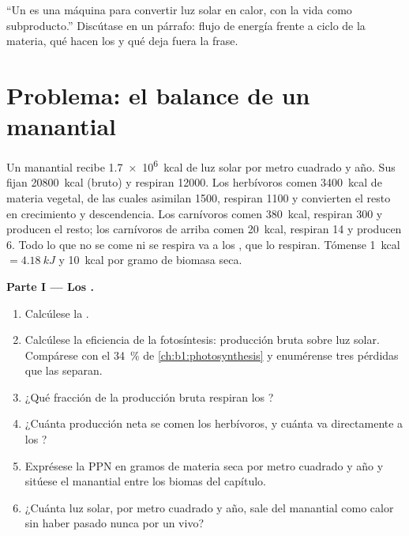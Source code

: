 \begin{exercise}[$\star\star\star$]\label{exo:b1:ecosystem-organization:12}
``Un  es una máquina para convertir luz solar en calor, con la
vida como subproducto.'' Discútase en un párrafo: flujo de energía frente a
ciclo de la materia, qué hacen los  y qué deja fuera la
frase.
\end{exercise}

\section{Problema: el balance de un manantial}

\begin{problem}
\label{pb:b1:ecosystem-organization:1}
Un manantial recibe \qty{1.7e6}{kcal} de luz solar por metro cuadrado y año.
Sus  fijan \qty{20800}{kcal} (bruto) y respiran \qty{12000}{}.
Los herbívoros comen \qty{3400}{kcal} de materia vegetal, de las cuales
asimilan \qty{1500}{}, respiran \qty{1100}{} y convierten el resto en
crecimiento y descendencia. Los carnívoros comen \qty{380}{kcal}, respiran
\qty{300}{} y producen el resto; los carnívoros de arriba comen
\qty{20}{kcal}, respiran \qty{14}{} y producen \qty{6}{}. Todo lo que no se
come ni se respira va a los , que lo respiran. Tómense
\qty{1}{kcal} $= \qty{4.18}{kJ}$ y \qty{10}{kcal} por gramo de biomasa
seca.

\medskip
\noindent\textbf{Parte I --- Los .}
\begin{enumerate}
  \item Calcúlese la .
  \item Calcúlese la eficiencia de la fotosíntesis: producción bruta sobre
        luz solar. Compárese con el \qty{34}{\%} de
        \cref{ch:b1:photosynthesis} y enumérense tres pérdidas que las
        separan.
  \item ¿Qué fracción de la producción bruta respiran los ?
  \item ¿Cuánta producción neta se comen los herbívoros, y cuánta va
        directamente a los ?
  \item Exprésese la PPN en gramos de materia seca por metro cuadrado y año
        y sitúese el manantial entre los biomas del capítulo.
  \item ¿Cuánta luz solar, por metro cuadrado y año, sale del manantial como
        calor sin haber pasado nunca por un  vivo?
\end{enumerate}


\end{problem}

